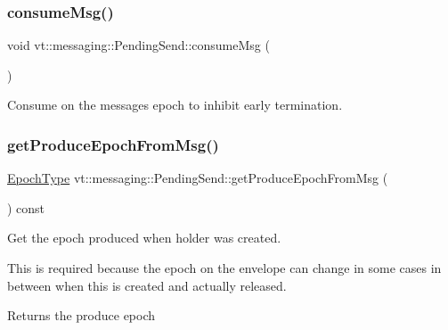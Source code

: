 \subsubsection{\texorpdfstring{consume\+Msg()}{consumeMsg()}}
{\footnotesize\ttfamily void vt\+::messaging\+::\+Pending\+Send\+::consume\+Msg (\begin{DoxyParamCaption}{ }\end{DoxyParamCaption})\hspace{0.3cm}{\ttfamily [private]}}



Consume on the messages epoch to inhibit early termination. 

\mbox{\label{structvt_1_1messaging_1_1_pending_send_a8293dffe4d8cdc81de573d2edf0ee4cb}} 
\subsubsection{\texorpdfstring{get\+Produce\+Epoch\+From\+Msg()}{getProduceEpochFromMsg()}}
{\footnotesize\ttfamily \hyperlink{namespacevt_a985a5adf291c34a3ca263b3378388236}{Epoch\+Type} vt\+::messaging\+::\+Pending\+Send\+::get\+Produce\+Epoch\+From\+Msg (\begin{DoxyParamCaption}{ }\end{DoxyParamCaption}) const\hspace{0.3cm}{\ttfamily [private]}}



Get the epoch produced when holder was created. 

This is required because the epoch on the envelope can change in some cases in between when this is created and actually released.

\begin{DoxyReturn}{Returns}
the produce epoch 
\end{DoxyReturn}
\mbox{\label{structvt_1_1messaging_1_1_pending_send_aecef2d10d22564d142b9de52a57d81c8}} 
